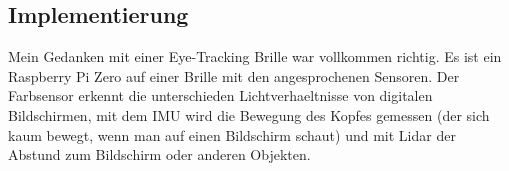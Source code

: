 \subsection{Implementierung}

Mein Gedanken mit einer Eye-Tracking Brille war vollkommen richtig. Es ist ein Raspberry Pi Zero auf einer Brille mit den angesprochenen 
Sensoren. Der Farbsensor erkennt die unterschieden Lichtverhaeltnisse von digitalen Bildschirmen, mit dem IMU wird die Bewegung des Kopfes gemessen (der sich kaum bewegt, wenn man auf einen Bildschirm schaut) und mit Lidar der Abstund zum Bildschirm oder anderen Objekten. 

